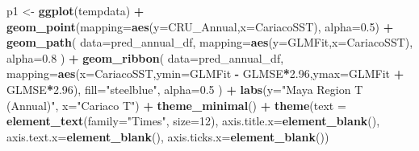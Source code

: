 \documentclass[]{article}
\newenvironment{Shaded}{\begin{snugshade}}{\end{snugshade}}
\newcommand{\KeywordTok}[1]{\textcolor[rgb]{0.13,0.29,0.53}{\textbf{#1}}}
\newcommand{\DataTypeTok}[1]{\textcolor[rgb]{0.13,0.29,0.53}{#1}}
\newcommand{\DecValTok}[1]{\textcolor[rgb]{0.00,0.00,0.81}{#1}}
\newcommand{\FloatTok}[1]{\textcolor[rgb]{0.00,0.00,0.81}{#1}}
\newcommand{\StringTok}[1]{\textcolor[rgb]{0.31,0.60,0.02}{#1}}
\newcommand{\OperatorTok}[1]{\textcolor[rgb]{0.81,0.36,0.00}{\textbf{#1}}}
\newcommand{\NormalTok}[1]{#1}
\begin{document}
\begin{Shaded}
\begin{Highlighting}[]
\NormalTok{p1 <-}\StringTok{ }\KeywordTok{ggplot}\NormalTok{(tempdata) }\OperatorTok{+}
\StringTok{    }\KeywordTok{geom_point}\NormalTok{(}\DataTypeTok{mapping=}\KeywordTok{aes}\NormalTok{(}\DataTypeTok{y=}\NormalTok{CRU_Annual,}\DataTypeTok{x=}\NormalTok{CariacoSST),}
        \DataTypeTok{alpha=}\FloatTok{0.5}\NormalTok{) }\OperatorTok{+}
\StringTok{    }\KeywordTok{geom_path}\NormalTok{(}
        \DataTypeTok{data=}\NormalTok{pred_annual_df,}
        \DataTypeTok{mapping=}\KeywordTok{aes}\NormalTok{(}\DataTypeTok{y=}\NormalTok{GLMFit,}\DataTypeTok{x=}\NormalTok{CariacoSST),}
        \DataTypeTok{alpha=}\FloatTok{0.8}
\NormalTok{        ) }\OperatorTok{+}
\StringTok{    }\KeywordTok{geom_ribbon}\NormalTok{(}
        \DataTypeTok{data=}\NormalTok{pred_annual_df,}
        \DataTypeTok{mapping=}\KeywordTok{aes}\NormalTok{(}\DataTypeTok{x=}\NormalTok{CariacoSST,}\DataTypeTok{ymin=}\NormalTok{GLMFit }\OperatorTok{-}\StringTok{ }\NormalTok{GLMSE}\OperatorTok{*}\FloatTok{2.96}\NormalTok{,}\DataTypeTok{ymax=}\NormalTok{GLMFit }\OperatorTok{+}\StringTok{ }\NormalTok{GLMSE}\OperatorTok{*}\FloatTok{2.96}\NormalTok{),}
        \DataTypeTok{fill=}\StringTok{"steelblue"}\NormalTok{,}
        \DataTypeTok{alpha=}\FloatTok{0.5}
\NormalTok{        ) }\OperatorTok{+}
\StringTok{    }\KeywordTok{labs}\NormalTok{(}\DataTypeTok{y=}\StringTok{"Maya Region T (Annual)"}\NormalTok{, }\DataTypeTok{x=}\StringTok{"Cariaco T"}\NormalTok{) }\OperatorTok{+}
\StringTok{    }\KeywordTok{theme_minimal}\NormalTok{() }\OperatorTok{+}
\StringTok{    }\KeywordTok{theme}\NormalTok{(}\DataTypeTok{text =} \KeywordTok{element_text}\NormalTok{(}\DataTypeTok{family=}\StringTok{"Times"}\NormalTok{, }\DataTypeTok{size=}\DecValTok{12}\NormalTok{),}
        \DataTypeTok{axis.title.x=}\KeywordTok{element_blank}\NormalTok{(),}
        \DataTypeTok{axis.text.x=}\KeywordTok{element_blank}\NormalTok{(),}
        \DataTypeTok{axis.ticks.x=}\KeywordTok{element_blank}\NormalTok{())}


\end{Highlighting}
\end{Shaded}
\end{document}
